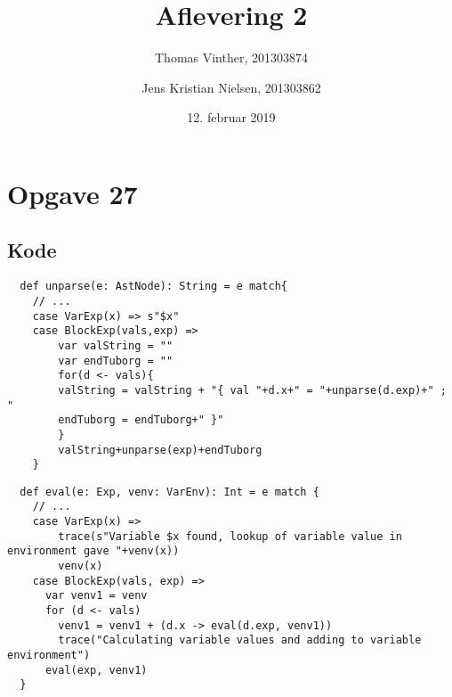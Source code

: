 \documentclass[a1paper, 10pt]{article}
\title{Aflevering 2}
\author{Thomas Vinther, 201303874 \and Jens Kristian Nielsen, 201303862}
\date{12. februar 2019}
\theoremstyle{remark}
\begin{document}
\maketitle
\section*{Opgave 27}
\subsection*{Kode}
\begin{lstlisting}
  def unparse(e: AstNode): String = e match{
  	// ...
  	case VarExp(x) => s"$x"
  	case BlockExp(vals,exp) =>
  		var valString = ""
	  	var endTuborg = ""
  		for(d <- vals){
	  	valString = valString + "{ val "+d.x+" = "+unparse(d.exp)+" ; "
	  	endTuborg = endTuborg+" }"
	  	}
  		valString+unparse(exp)+endTuborg
    }
\end{lstlisting}
\begin{lstlisting}
  def eval(e: Exp, venv: VarEnv): Int = e match {
    // ...
    case VarExp(x) => 
    	trace(s"Variable $x found, lookup of variable value in environment gave "+venv(x))
    	venv(x)
    case BlockExp(vals, exp) =>
      var venv1 = venv
      for (d <- vals)
        venv1 = venv1 + (d.x -> eval(d.exp, venv1))
        trace("Calculating variable values and adding to variable environment")
      eval(exp, venv1)
  }
\end{lstlisting}
\end{document}
